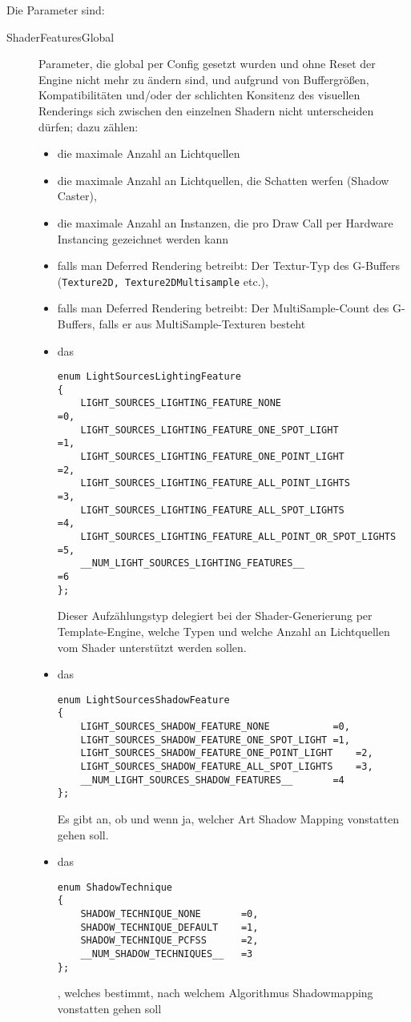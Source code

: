	Die Parameter sind:	
	\begin{description}
	
	
		\item[ShaderFeaturesGlobal] Parameter, die global per Config gesetzt wurden und ohne Reset der Engine nicht
			mehr zu ändern sind, und aufgrund von Buffergrößen, Kompatibilitäten und/oder der schlichten Konsitenz
			des visuellen Renderings sich zwischen den einzelnen Shadern nicht unterscheiden dürfen; dazu zählen:
		 	\begin{itemize}
		 	\item die maximale Anzahl an Lichtquellen
		 	\item die maximale Anzahl an Lichtquellen, die Schatten werfen (Shadow Caster),
		 	\item die maximale Anzahl an Instanzen, die pro Draw Call per Hardware Instancing gezeichnet werden kann
		 	\item falls man Deferred Rendering betreibt:
		 		 Der Textur-Typ des G-Buffers (\lstinline|Texture2D, Texture2DMultisample| etc.),
		 	\item falls man Deferred Rendering betreibt: Der MultiSample-Count des G-Buffers, falls er aus 
		 		MultiSample-Texturen besteht
		 	\item das
		 	\begin{lstlisting}
enum LightSourcesLightingFeature
{
	LIGHT_SOURCES_LIGHTING_FEATURE_NONE						=0,
	LIGHT_SOURCES_LIGHTING_FEATURE_ONE_SPOT_LIGHT			=1,
	LIGHT_SOURCES_LIGHTING_FEATURE_ONE_POINT_LIGHT			=2,
	LIGHT_SOURCES_LIGHTING_FEATURE_ALL_POINT_LIGHTS			=3,
	LIGHT_SOURCES_LIGHTING_FEATURE_ALL_SPOT_LIGHTS			=4,
	LIGHT_SOURCES_LIGHTING_FEATURE_ALL_POINT_OR_SPOT_LIGHTS	=5,
	__NUM_LIGHT_SOURCES_LIGHTING_FEATURES__					=6
}; 
		 	\end{lstlisting}
		 	Dieser Aufzählungstyp delegiert bei der Shader-Generierung per Template-Engine, welche Typen 
		 	und welche Anzahl an Lichtquellen vom Shader unterstützt werden sollen.
			\item das
		 	\begin{lstlisting}		 	
enum LightSourcesShadowFeature
{
	LIGHT_SOURCES_SHADOW_FEATURE_NONE			=0,
	LIGHT_SOURCES_SHADOW_FEATURE_ONE_SPOT_LIGHT	=1,
	LIGHT_SOURCES_SHADOW_FEATURE_ONE_POINT_LIGHT	=2,
	LIGHT_SOURCES_SHADOW_FEATURE_ALL_SPOT_LIGHTS	=3,
	__NUM_LIGHT_SOURCES_SHADOW_FEATURES__		=4
};	
		 	\end{lstlisting}
		 	Es gibt an, ob und wenn ja, welcher Art Shadow Mapping vonstatten gehen soll.
		 	
		 	\item das
		 	\begin{lstlisting}
enum ShadowTechnique
{
	SHADOW_TECHNIQUE_NONE		=0,
	SHADOW_TECHNIQUE_DEFAULT	=1,
	SHADOW_TECHNIQUE_PCFSS		=2,
	__NUM_SHADOW_TECHNIQUES__	=3
};		 	
		 	\end{lstlisting}
		 	, welches bestimmt, nach welchem Algorithmus Shadowmapping vonstatten gehen soll
		\end{itemize}
		

\end{description}
